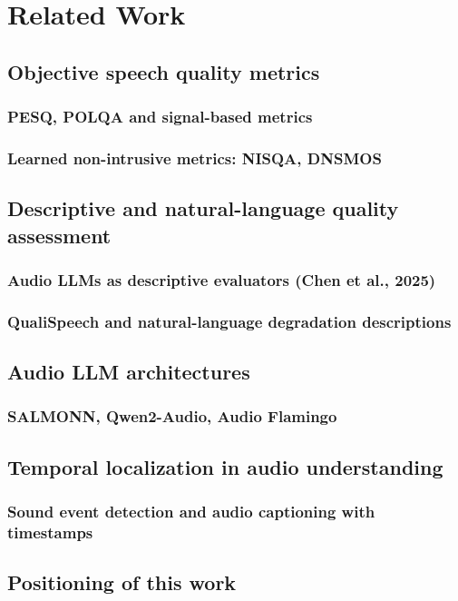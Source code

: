 \chapter{Related Work} \label{ch:related-work}

\section{Objective speech quality metrics} \label{sec:related-objective}
\subsection{PESQ, POLQA and signal-based metrics}
\subsection{Learned non-intrusive metrics: NISQA, DNSMOS}

\section{Descriptive and natural-language quality assessment} \label{sec:related-descriptive}
\subsection{Audio LLMs as descriptive evaluators (Chen et al., 2025)}
\subsection{QualiSpeech and natural-language degradation descriptions}

\section{Audio LLM architectures} \label{sec:related-audio-llms}
\subsection{SALMONN, Qwen2-Audio, Audio Flamingo}

\section{Temporal localization in audio understanding} \label{sec:related-temporal}
\subsection{Sound event detection and audio captioning with timestamps}

\section{Positioning of this work} \label{sec:related-positioning}
